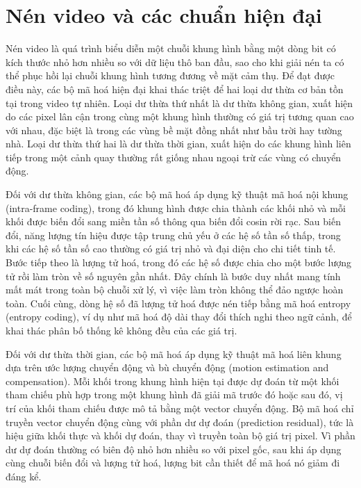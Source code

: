 \section{Nén video và các chuẩn hiện đại}

Nén video là quá trình biểu diễn một chuỗi khung hình bằng một dòng bit có kích thước nhỏ hơn nhiều so với dữ liệu thô ban đầu, sao cho khi giải nén ta có thể phục hồi lại chuỗi khung hình tương đương về mặt cảm thụ. Để đạt được điều này, các bộ mã hoá hiện đại khai thác triệt để hai loại dư thừa cơ bản tồn tại trong video tự nhiên. Loại dư thừa thứ nhất là dư thừa không gian, xuất hiện do các pixel lân cận trong cùng một khung hình thường có giá trị tương quan cao với nhau, đặc biệt là trong các vùng bề mặt đồng nhất như bầu trời hay tường nhà. Loại dư thừa thứ hai là dư thừa thời gian, xuất hiện do các khung hình liên tiếp trong một cảnh quay thường rất giống nhau ngoại trừ các vùng có chuyển động.

Đối với dư thừa không gian, các bộ mã hoá áp dụng kỹ thuật mã hoá nội khung (intra-frame coding), trong đó khung hình được chia thành các khối nhỏ và mỗi khối được biến đổi sang miền tần số thông qua biến đổi cosin rời rạc. Sau biến đổi, năng lượng tín hiệu được tập trung chủ yếu ở các hệ số tần số thấp, trong khi các hệ số tần số cao thường có giá trị nhỏ và đại diện cho chi tiết tinh tế. Bước tiếp theo là lượng tử hoá, trong đó các hệ số được chia cho một bước lượng tử rồi làm tròn về số nguyên gần nhất. Đây chính là bước duy nhất mang tính mất mát trong toàn bộ chuỗi xử lý, vì việc làm tròn không thể đảo ngược hoàn toàn. Cuối cùng, dòng hệ số đã lượng tử hoá được nén tiếp bằng mã hoá entropy (entropy coding), ví dụ như mã hoá độ dài thay đổi thích nghi theo ngữ cảnh, để khai thác phân bố thống kê không đều của các giá trị.

Đối với dư thừa thời gian, các bộ mã hoá áp dụng kỹ thuật mã hoá liên khung dựa trên ước lượng chuyển động và bù chuyển động (motion estimation and compensation). Mỗi khối trong khung hình hiện tại được dự đoán từ một khối tham chiếu phù hợp trong một khung hình đã giải mã trước đó hoặc sau đó, vị trí của khối tham chiếu được mô tả bằng một vector chuyển động. Bộ mã hoá chỉ truyền vector chuyển động cùng với phần dư dự đoán (prediction residual), tức là hiệu giữa khối thực và khối dự đoán, thay vì truyền toàn bộ giá trị pixel. Vì phần dư dự đoán thường có biên độ nhỏ hơn nhiều so với pixel gốc, sau khi áp dụng cùng chuỗi biến đổi và lượng tử hoá, lượng bit cần thiết để mã hoá nó giảm đi đáng kể.

